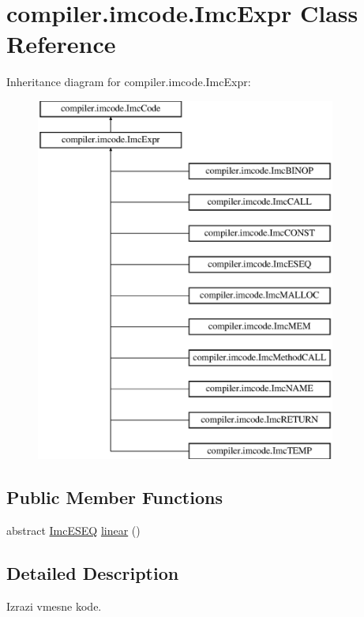 \hypertarget{classcompiler_1_1imcode_1_1_imc_expr}{}\section{compiler.\+imcode.\+Imc\+Expr Class Reference}
\label{classcompiler_1_1imcode_1_1_imc_expr}
Inheritance diagram for compiler.\+imcode.\+Imc\+Expr\+:\begin{figure}[H]
\begin{center}
\leavevmode
\includegraphics[height=12.000000cm]{classcompiler_1_1imcode_1_1_imc_expr}
\end{center}
\end{figure}
\subsection*{Public Member Functions}
\begin{DoxyCompactItemize}
\item 
abstract \hyperlink{classcompiler_1_1imcode_1_1_imc_e_s_e_q}{Imc\+E\+S\+EQ} \hyperlink{classcompiler_1_1imcode_1_1_imc_expr_adbdc14b453fc4434762e1a8f0d820e20}{linear} ()
\end{DoxyCompactItemize}


\subsection{Detailed Description}
Izrazi vmesne kode.

